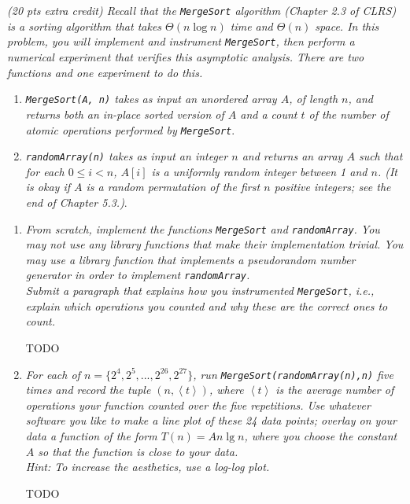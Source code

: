 \documentclass[12pt]{article} \setlength{\oddsidemargin}{0in}
\begin{document}
\section{}
\textit{(20 pts extra credit) Recall that the \texttt{MergeSort} algorithm (Chapter 2.3 of CLRS) is a sorting algorithm that takes $\Theta(n \log n)$ time and $\Theta(n)$ space. In this problem, you will implement and instrument \texttt{MergeSort}, then perform a numerical experiment that verifies this asymptotic analysis. There are two functions and one experiment to do this.}
\begin{enumerate}[label=(\roman*)]
\item\textit{\texttt{MergeSort(A, n)} takes as input an unordered array $A$, of length $n$, and returns both an in-place sorted version of $A$ and a count $t$ of the number of atomic operations performed by \texttt{MergeSort}}.
\item\textit{\texttt{randomArray(n)} takes as input an integer $n$ and returns an array $A$ such that for each $0 \leq i < n$, $A[i]$ is a uniformly random integer between 1 and $n$. (It is okay if $A$ is a random permutation of the first $n$ positive integers; see the end of Chapter 5.3.)}.
\end{enumerate}
\begin{enumerate}
\item\textit{From scratch, implement the functions \texttt{MergeSort} and \texttt{randomArray}. You may not use any library functions that make their implementation trivial. You may use a library function that implements a pseudorandom number generator in order to implement \texttt{randomArray}.\\
Submit a paragraph that explains how you instrumented \texttt{MergeSort}, i.e., explain which operations you counted and why these are the correct ones to count.}

TODO

\item\textit{For each of $n = \{2^4,2^5,...,2^{26},2^{27}\}$, run \texttt{MergeSort(randomArray(n),n)} five times and record the tuple $(n, \left<t\right>)$, where $\left<t\right>$ is the average number of operations your function counted over the five repetitions. Use whatever software you like to make a line plot of these 24 data points; overlay on your data a function of the form $T(n) = An\lg n$, where you choose the constant $A$ so that the function is close to your data.\\
Hint: To increase the aesthetics, use a log-log plot.}

TODO

\end{enumerate}
\end{document}
